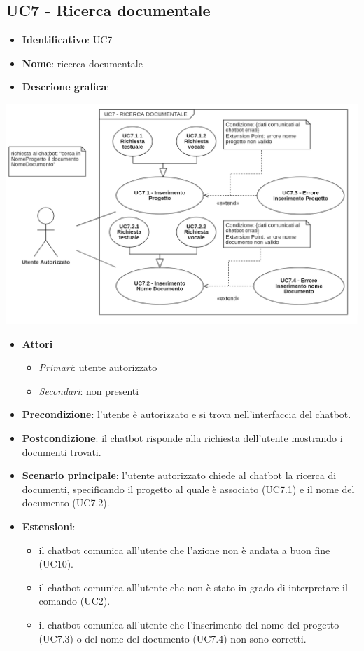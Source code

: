\subsection{UC7 - Ricerca documentale}
\begin{itemize}
    \item \textbf{Identificativo}: UC7
    \item \textbf{Nome}: ricerca documentale
    \item \textbf{Descrione grafica}:
\end{itemize}
\begin{center}
    \includegraphics{images/UC7.png} 
\end{center}
 \begin{itemize}
    \item \textbf{Attori}
 \begin{itemize} 
    \item \textit{Primari}: utente autorizzato
    \item \textit{Secondari}: non presenti
 \end{itemize}
 \item \textbf{Precondizione}: l'utente è autorizzato e si trova nell'interfaccia del chatbot.
 \item \textbf{Postcondizione}: il chatbot risponde alla richiesta dell'utente mostrando i documenti trovati.
 \item \textbf{Scenario principale}: l'utente autorizzato chiede al chatbot la ricerca di documenti, specificando il progetto al quale è associato (UC7.1) e il nome del documento (UC7.2).
 \item \textbf{Estensioni}: 
 \begin{itemize} 
    \item il chatbot comunica all'utente che l'azione non è andata a buon fine (UC10).
    \item il chatbot comunica all'utente che non è stato in grado di interpretare il comando (UC2).
    \item il chatbot comunica all'utente che l'inserimento del nome del progetto (UC7.3) o del nome del documento (UC7.4) non sono corretti.
 \end{itemize}
\end{itemize}
\newpage
